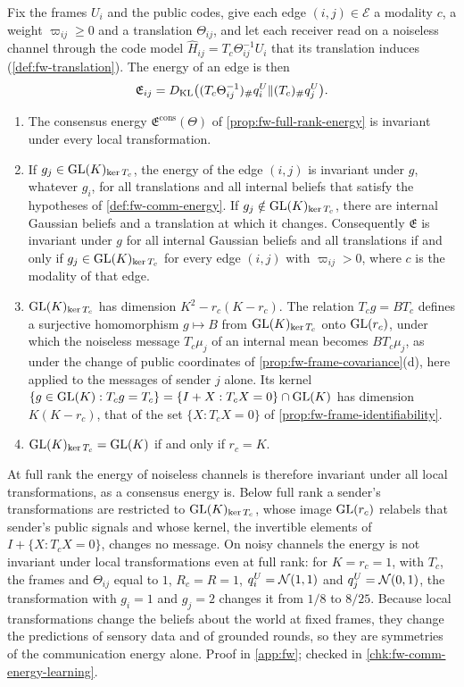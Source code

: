 \begin{proposition}\label{prop:fw-energy-symmetry}
Fix the frames $U_i$ and the public codes, give each edge $(i,j)\in\mathcal E$ a modality $c$, a weight $\varpi_{ij}\ge0$ and a translation $\Theta_{ij}$, and let each receiver read on a noiseless channel through the code model $\hat H_{ij}=T_c\Theta_{ij}^{-1}U_i$ that its translation induces (\cref{def:fw-translation}). The energy of an edge is then
\[
\mathfrak E_{ij}=D_{\mathrm{KL}}\bigl((T_c\Theta_{ij}^{-1})_\#q^U_i\Vert(T_c)_\#q^U_j\bigr).
\]
\begin{enumerate}
\item[(a)] The consensus energy $\mathfrak E^{\mathrm{cons}}(\Theta)$ of \cref{prop:fw-full-rank-energy} is invariant under every local transformation.
\item[(b)] If $g_j\in\mathrm{GL}(K)_{\ker T_c}$, the energy of the edge $(i,j)$ is invariant under $g$, whatever $g_i$, for all translations and all internal beliefs that satisfy the hypotheses of \cref{def:fw-comm-energy}. If $g_j\notin\mathrm{GL}(K)_{\ker T_c}$, there are internal Gaussian beliefs and a translation at which it changes. Consequently $\mathfrak E$ is invariant under $g$ for all internal Gaussian beliefs and all translations if and only if $g_j\in\mathrm{GL}(K)_{\ker T_c}$ for every edge $(i,j)$ with $\varpi_{ij}>0$, where $c$ is the modality of that edge.
\item[(c)] $\mathrm{GL}(K)_{\ker T_c}$ has dimension $K^2-r_c(K-r_c)$. The relation $T_cg=BT_c$ defines a surjective homomorphism $g\mapsto B$ from $\mathrm{GL}(K)_{\ker T_c}$ onto $\mathrm{GL}(r_c)$, under which the noiseless message $T_c\mu_j$ of an internal mean becomes $BT_c\mu_j$, as under the change of public coordinates of \cref{prop:fw-frame-covariance}(d), here applied to the messages of sender $j$ alone. Its kernel $\{g\in\mathrm{GL}(K):T_cg=T_c\}=\{I+X:T_cX=0\}\cap\mathrm{GL}(K)$ has dimension $K(K-r_c)$, that of the set $\{X:T_cX=0\}$ of \cref{prop:fw-frame-identifiability}.
\item[(d)] $\mathrm{GL}(K)_{\ker T_c}=\mathrm{GL}(K)$ if and only if $r_c=K$.
\end{enumerate}
\end{proposition}

At full rank the energy of noiseless channels is therefore invariant under all local transformations, as a consensus energy is. Below full rank a sender's transformations are restricted to $\mathrm{GL}(K)_{\ker T_c}$, whose image $\mathrm{GL}(r_c)$ relabels that sender's public signals and whose kernel, the invertible elements of $I+\{X:T_cX=0\}$, changes no message. On noisy channels the energy is not invariant under local transformations even at full rank: for $K=r_c=1$, with $T_c$, the frames and $\Theta_{ij}$ equal to $1$, $R_c=\hat R=1$, $q^U_i=\mathcal{N}(1,1)$ and $q^U_j=\mathcal{N}(0,1)$, the transformation with $g_i=1$ and $g_j=2$ changes it from $1/8$ to $8/25$. Because local transformations change the beliefs about the world at fixed frames, they change the predictions of sensory data and of grounded rounds, so they are symmetries of the communication energy alone. Proof in \cref{app:fw}; checked in \cref{chk:fw-comm-energy-learning}.

